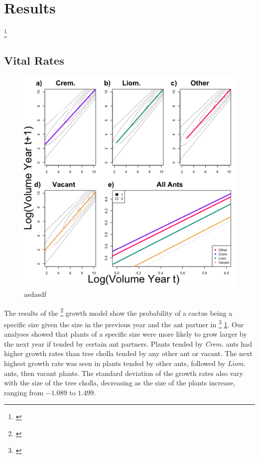 \documentclass[12pt,a4paper]{article}
\newcommand{\tom}[2]{{\color{red}{#1}}\footnote{\textit{\color{red}{#2}}}}
\begin{document}
		
		\section*{Results}
		\tom{I’m honestly not sure what all should be included here. I feel like I need a lot more info about the specifics???}{Let's talk about this.}
		
		\subsection*{Vital Rates}
		\begin{figure}[h]
			\includegraphics[width=0.58\linewidth]{grow_contour_lines_color.png}
			\caption{asdasdf}
			\label{fig:grow}
		\end{figure}
		The results of the \tom{Bayesian}{the model is not intrinsically Bayesian} growth model show the probability of a cactus being a specific size given the size in the previous year and the ant partner in \tom{Figure}{this figure needs data} \ref{fig:grow}.
		Our analyses showed that plants of a specific size were more likely to grow larger by the next year if tended by certain ant partners. 
		Plants tended by \textit{Crem.} ants had higher growth rates than tree cholla tended by any other ant or vacant. 
		The next highest growth rate was seen in plants tended by other ants, followed by \textit{Liom.} ants, then vacant plants. 
		The standard deviation of the growth rates also vary with the size of the tree cholla, decreasing as the size of the plants increase, ranging from $-1.089$ to $1.499$.
		
\end{document}
